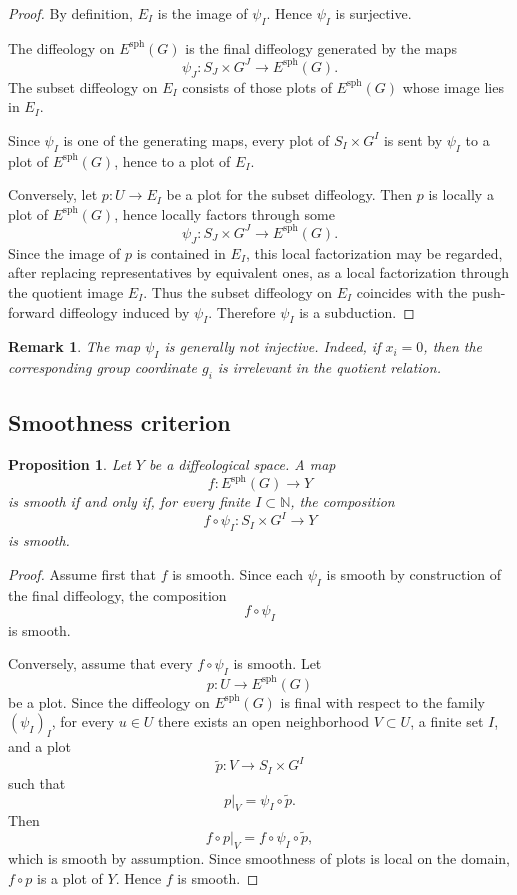 \documentclass[11pt]{amsart}
\newtheorem{proposition}[definition]{Proposition}
\newtheorem{remark}[definition]{Remark}
\begin{document}
\begin{proof}
By definition, \(E_I\) is the image of \(\psi_I\). Hence \(\psi_I\) is
surjective.

The diffeology on \(E^{\mathrm{sph}}(G)\) is the final diffeology generated by
the maps
\[
\psi_J:S_J\times G^J\to E^{\mathrm{sph}}(G).
\]
The subset diffeology on \(E_I\) consists of those plots of
\(E^{\mathrm{sph}}(G)\) whose image lies in \(E_I\).

Since \(\psi_I\) is one of the generating maps, every plot of
\(S_I\times G^I\) is sent by \(\psi_I\) to a plot of
\(E^{\mathrm{sph}}(G)\), hence to a plot of \(E_I\).

Conversely, let \(p:U\to E_I\) be a plot for the subset diffeology. Then
\(p\) is locally a plot of \(E^{\mathrm{sph}}(G)\), hence locally factors
through some
\[
\psi_J:S_J\times G^J\to E^{\mathrm{sph}}(G).
\]
Since the image of \(p\) is contained in \(E_I\), this local factorization may
be regarded, after replacing representatives by equivalent ones, as a local
factorization through the quotient image \(E_I\). Thus the subset diffeology
on \(E_I\) coincides with the push-forward diffeology induced by
\(\psi_I\). Therefore \(\psi_I\) is a subduction.
\end{proof}

\begin{remark}
The map \(\psi_I\) is generally not injective. Indeed, if \(x_i=0\), then the
corresponding group coordinate \(g_i\) is irrelevant in the quotient relation.
\end{remark}

\subsection{Smoothness criterion}

\begin{proposition}
Let \(Y\) be a diffeological space. A map
\[
f:E^{\mathrm{sph}}(G)\to Y
\]
is smooth if and only if, for every finite \(I\subset\mathbb N\), the
composition
\[
f\circ \psi_I:S_I\times G^I\to Y
\]
is smooth.
\end{proposition}

\begin{proof}
Assume first that \(f\) is smooth. Since each \(\psi_I\) is smooth by
construction of the final diffeology, the composition
\[
f\circ\psi_I
\]
is smooth.

Conversely, assume that every \(f\circ\psi_I\) is smooth. Let
\[
p:U\to E^{\mathrm{sph}}(G)
\]
be a plot. Since the diffeology on \(E^{\mathrm{sph}}(G)\) is final with
respect to the family \((\psi_I)_I\), for every \(u\in U\) there exists an open
neighborhood \(V\subset U\), a finite set \(I\), and a plot
\[
\widetilde p:V\to S_I\times G^I
\]
such that
\[
p|_V=\psi_I\circ\widetilde p.
\]
Then
\[
f\circ p|_V
=
f\circ\psi_I\circ\widetilde p,
\]
which is smooth by assumption. Since smoothness of plots is local on the
domain, \(f\circ p\) is a plot of \(Y\). Hence \(f\) is smooth.
\end{proof}
\end{document}
